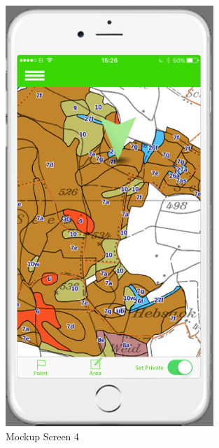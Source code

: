 \begin{figure}[h]
\centering
    \includegraphics[width=0.7\textwidth]{mockup1-4}
    \caption{Mockup Screen 4}
    \label{fig:mesh4}
\end{figure}

